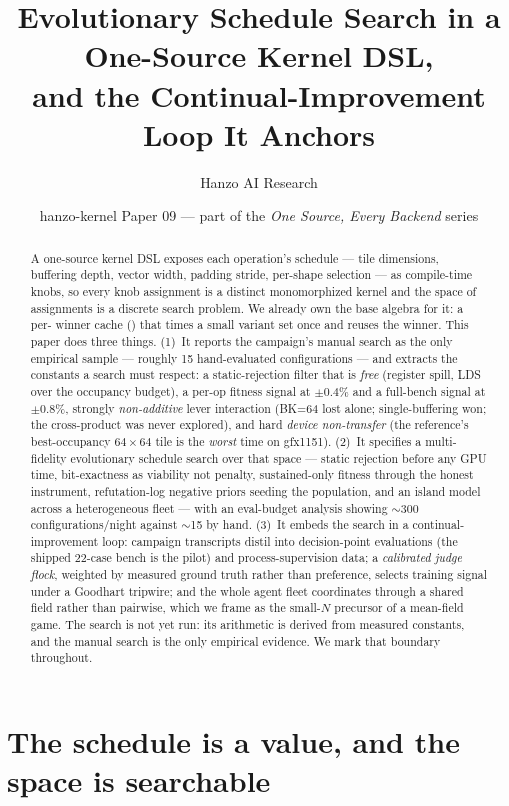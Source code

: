 \documentclass[11pt]{article}
\title{\textbf{Evolutionary Schedule Search in a One-Source Kernel DSL,\\
and the Continual-Improvement Loop It Anchors}}
\author{Hanzo AI Research}
\date{hanzo-kernel Paper 09 --- part of the \emph{One Source, Every Backend} series}
\begin{document}
\maketitle

\begin{abstract}
A one-source kernel DSL exposes each operation's schedule --- tile dimensions, buffering depth, vector
width, padding stride, per-shape selection --- as compile-time knobs, so every knob assignment is a distinct
monomorphized kernel and the space of assignments is a discrete search problem. We already own the base
algebra for it: a per- winner cache () that times a small variant
set once and reuses the winner. This paper does three things. (1)~It reports the campaign's manual search as
the only empirical sample --- roughly 15 hand-evaluated configurations --- and extracts the constants a
search must respect: a static-rejection filter that is \emph{free} (register spill, LDS over the occupancy
budget), a per-op fitness signal at $\pm0.4\%$ and a full-bench signal at $\pm0.8\%$, strongly
\emph{non-additive} lever interaction (BK=64 lost alone; single-buffering won; the cross-product was never
explored), and hard \emph{device non-transfer} (the reference's best-occupancy $64{\times}64$ tile is the
\emph{worst} time on gfx1151). (2)~It specifies a multi-fidelity evolutionary schedule search over that
space --- static rejection before any GPU time, bit-exactness as viability not penalty, sustained-only
fitness through the honest instrument, refutation-log negative priors seeding the population, and an island
model across a heterogeneous fleet --- with an eval-budget analysis showing $\sim$300 configurations/night
against $\sim$15 by hand. (3)~It embeds the search in a continual-improvement loop: campaign transcripts
distil into decision-point evaluations (the shipped 22-case  bench is the pilot) and
process-supervision data; a \emph{calibrated judge flock}, weighted by measured ground truth rather than
preference, selects training signal under a Goodhart tripwire; and the whole agent fleet coordinates through
a shared field rather than pairwise, which we frame as the small-$N$ precursor of a mean-field game. The
search is not yet run: its arithmetic is derived from measured constants, and the manual search is the only
empirical evidence. We mark that boundary throughout.
\end{abstract}

\section{The schedule is a value, and the space is searchable}
\label{sec:intro}
\end{document}
